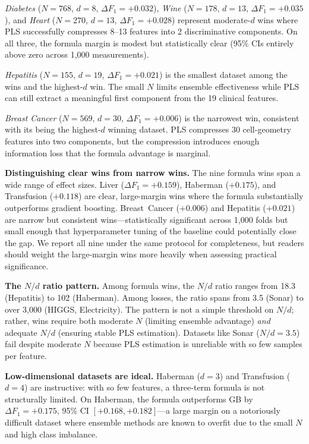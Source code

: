 \documentclass[journal]{IEEEtran}
\begin{document}
\emph{Diabetes} ($N = 768$, $d = 8$, $\Delta F_1 = +0.032$),
\emph{Wine} ($N = 178$, $d = 13$, $\Delta F_1 = +0.035$), and
\emph{Heart} ($N = 270$, $d = 13$, $\Delta F_1 = +0.028$) represent
moderate-$d$ wins where PLS successfully compresses 8--13 features
into 2 discriminative components.  On all three, the formula margin
is modest but statistically clear (95\% CIs entirely above zero
across 1{,}000 measurements).

\emph{Hepatitis} ($N = 155$, $d = 19$, $\Delta F_1 = +0.021$) is
the smallest dataset among the wins and the highest-$d$ win.  The
small $N$ limits ensemble effectiveness while PLS can still extract
a meaningful first component from the 19 clinical features.

\emph{Breast Cancer} ($N = 569$, $d = 30$, $\Delta F_1 = +0.006$)
is the narrowest win, consistent with its being the highest-$d$
winning dataset.  PLS compresses 30 cell-geometry features into two
components, but the compression introduces enough information loss
that the formula advantage is marginal.

\textbf{Distinguishing clear wins from narrow wins.}
The nine formula wins span a wide range of effect sizes.  Liver
($\Delta F_1 = +0.159$), Haberman ($+0.175$), and Transfusion
($+0.118$) are clear, large-margin wins where the formula
substantially outperforms gradient boosting.  Breast~Cancer
($+0.006$) and Hepatitis ($+0.021$) are narrow but consistent
wins---statistically significant across 1{,}000 folds but small
enough that hyperparameter tuning of the baseline could potentially
close the gap.  We report all nine under the same protocol for
completeness, but readers should weight the large-margin wins more
heavily when assessing practical significance.

\textbf{The $N/d$ ratio pattern.}
Among formula wins, the $N/d$ ratio ranges from 18.3 (Hepatitis)
to 102 (Haberman).  Among losses, the ratio spans from 3.5 (Sonar)
to over 3{,}000 (HIGGS, Electricity).  The pattern is not a simple
threshold on $N/d$; rather, wins require both moderate $N$ (limiting
ensemble advantage) \emph{and} adequate $N/d$ (ensuring stable PLS
estimation).  Datasets like Sonar ($N/d = 3.5$) fail despite moderate
$N$ because PLS estimation is unreliable with so few samples per
feature.

\textbf{Low-dimensional datasets are ideal.}
Haberman ($d = 3$) and Transfusion ($d = 4$) are instructive:
with so few features, a three-term formula is not structurally
limited.  On Haberman, the formula outperforms GB by
$\Delta F_1 = +0.175$, 95\% CI $[+0.168, +0.182]$---a large
margin on a notoriously difficult dataset where ensemble methods
are known to overfit due to the small $N$ and high class imbalance.
\end{document}
